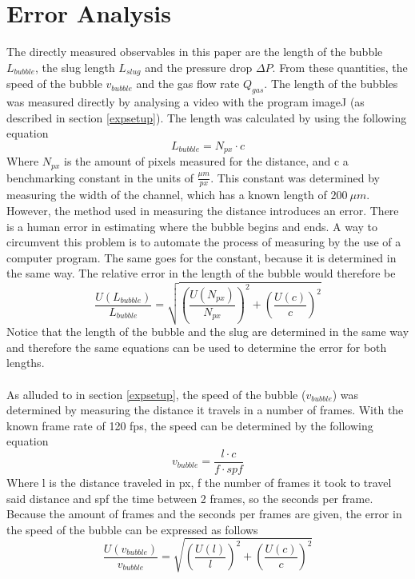 \appendix
\section{Error Analysis}
The directly measured observables in this paper are the length of the bubble $L_{bubble}$, the slug length $L_{slug}$ and the pressure drop $\Delta P$. From these quantities, the speed of the bubble $v_{bubble}$ and the gas flow rate $Q_{gas}$. The length of the bubbles was measured directly by analysing a video with the program imageJ (as described in section \ref{expsetup}). The length was calculated by using the following equation
\begin{equation}
L_{bubble} = N_{px} \cdot c
\end{equation}
Where $N_{px}$ is the amount of pixels measured for the distance, and c a benchmarking constant in the units of $\frac{\mu m}{px}$. This constant was determined by measuring the width of the channel, which has a known length of $200~\mu m$. However, the method used in measuring the distance introduces an error. There is a human error in estimating where the bubble begins and ends. A way to circumvent this problem is to automate the process of measuring by the use of a computer program. The same goes for the constant, because it is determined in the same way. The relative error in the length of the bubble would therefore be
\begin{equation}
\frac{U(L_{bubble})}{L_{bubble}} = \sqrt{\left(\frac{U(N_{px})}{N_{px}}\right)^{2} +  \left(\frac{U(c)}{c}\right)^{2}}
\end{equation}
Notice that the length of the bubble and the slug are determined in the same way and therefore the same equations can be used to determine the error for both lengths.\\
\\
As alluded to in section \ref{expsetup}, the speed of the bubble ($v_{bubble}$) was determined by measuring the distance it travels in a number of frames. With the known frame rate of 120 fps, the speed can be determined by the following equation
\begin{equation}
v_{bubble} = \frac{l \cdot c}{f \cdot spf}
\end{equation}
Where l is the distance traveled in px, f the number of frames it took to travel said distance and spf the time between 2 frames, so the seconds per frame. Because the amount of frames and the seconds per frames are given, the error in the speed of the bubble can be expressed as follows 
\begin{equation}
\frac{U(v_{bubble})}{v_{bubble}} = \sqrt{\left(\frac{U(l)}{l}\right)^{2} + \left(\frac{U(c)}{c}\right)^{2}}
\end{equation}
